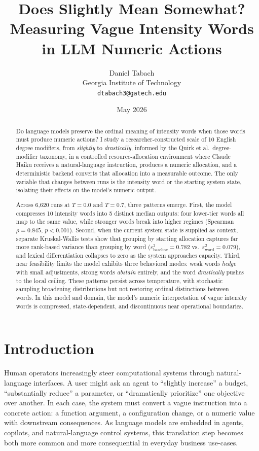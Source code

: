 \documentclass[11pt]{article}
\title{Does Slightly Mean Somewhat? Measuring Vague Intensity Words in LLM Numeric Actions}
\author{Daniel Tabach\\Georgia Institute of Technology\\\texttt{dtabach3@gatech.edu}}
\date{May 2026}
\begin{document}
\maketitle

\begin{abstract}
Do language models preserve the ordinal meaning of intensity words when those words must produce numeric actions? I study a researcher-constructed scale of 10 English degree modifiers, from \textit{slightly} to \textit{drastically}, informed by the Quirk et al.\ degree-modifier taxonomy, in a controlled resource-allocation environment where Claude Haiku receives a natural-language instruction, produces a numeric allocation, and a deterministic backend converts that allocation into a measurable outcome. The only variable that changes between runs is the intensity word or the starting system state, isolating their effects on the model's numeric output.

Across 6,620 runs at $T{=}0.0$ and $T{=}0.7$, three patterns emerge. First, the model compresses 10 intensity words into 5 distinct median outputs: four lower-tier words all map to the same value, while stronger words break into higher regimes (Spearman $\rho = 0.845$, $p < 0.001$). Second, when the current system state is supplied as context, separate Kruskal-Wallis tests show that grouping by starting allocation captures far more rank-based variance than grouping by word ($\varepsilon^2_\text{baseline} = 0.782$ vs.\ $\varepsilon^2_\text{word} = 0.079$), and lexical differentiation collapses to zero as the system approaches capacity. Third, near feasibility limits the model exhibits three behavioral modes: weak words \textit{hedge} with small adjustments, strong words \textit{abstain} entirely, and the word \textit{drastically} pushes to the local ceiling. These patterns persist across temperature, with stochastic sampling broadening distributions but not restoring ordinal distinctions between words. In this model and domain, the model's numeric interpretation of vague intensity words is compressed, state-dependent, and discontinuous near operational boundaries.
\end{abstract}

\section{Introduction}

Human operators increasingly steer computational systems through natural-language interfaces. A user might ask an agent to ``slightly increase'' a budget, ``substantially reduce'' a parameter, or ``dramatically prioritize'' one objective over another. In each case, the system must convert a vague instruction into a concrete action: a function argument, a configuration change, or a numeric value with downstream consequences. As language models are embedded in agents, copilots, and natural-language control systems, this translation step becomes both more common and more consequential in everyday business use-cases.
\end{document}
